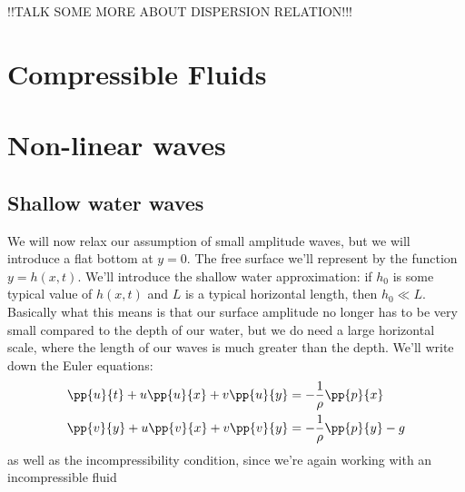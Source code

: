 \documentclass[12pt]{book}
\begin{document}
!!TALK SOME MORE ABOUT DISPERSION RELATION!!! %





























\chapter{Compressible Fluids}


\chapter{Non-linear waves}
\section{Shallow water waves}

We will now relax our assumption of small amplitude waves, but we will introduce a flat bottom at $y=0$.  The free surface we'll represent by the function $y=h(x,t)$.  We'll introduce the shallow water approximation:  if $h_0$ is some typical value of $h(x,t)$ and $L$ is a typical horizontal length, then $h_0 \ll L$.  Basically what this means is that our surface amplitude no longer has to be very small compared to the depth of our water, but we do need a large horizontal scale, where the length of our waves is much greater than the depth.  We'll write down the Euler equations:
\begin{align}
\pp{u}{t} + u\pp{u}{x} + v\pp{u}{y} &= -\frac{1}{\rho}\pp{p}{x} \label{29088417293461928346192834}\\
\pp{v}{y} + u\pp{v}{x} + v\pp{v}{y} &= -\frac{1}{\rho}\pp{p}{y} - g \label{219057239582709601}
\end{align}
as well as the incompressibility condition, since we're again working with an incompressible fluid
\end{document}

